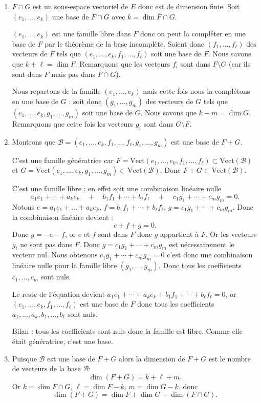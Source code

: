 \documentclass[11pt,a4paper]{article}
\begin{document}
\begin{enumerate}
  \item
$F\cap G$ est un sous-espace vectoriel de $E$ donc est de dimension finie.
Soit $(e_1,\ldots, e_k)$ une base de $F\cap G$ avec $k=\dim F\cap G$.

$(e_1,\ldots, e_k)$ est une famille libre dans $F$ donc on peut la compl\'eter en une base de $F$ 
par le th\'eor\`eme de la base incompl\`ete.
Soient donc $(f_1,\ldots,f_\ell)$ des vecteurs de $F$ tels que 
$(e_1,\ldots, e_k,f_1,\ldots,f_\ell)$ soit une base de $F$.
Nous savons que $k+\ell = \dim F$.
Remarquons que les vecteurs $f_i$ sont dans $F\setminus G$ (car ils sont dans $F$ mais pas dans $F\cap G$).

Nous repartons de la famille $(e_1,\ldots, e_k)$ mais cette fois nous la compl\'etons en une base de $G$ : soit donc $(g_1,\ldots,g_m)$ des vecteurs de $G$ tels que $(e_1,\ldots, e_k,g_1,\ldots,g_m)$ soit une base de $G$.
Nous savons que $k+m = \dim G$.
Remarquons que cette fois les vecteurs $g_i$ sont dans $G\setminus F$.

\item Montrons que $\mathcal{B}=(e_1,\ldots, e_k,f_1,\ldots,f_\ell,g_1,\ldots,g_m)$ est une base de $F+G$.

C'est une famille g\'en\'eratrice car $F=\mathrm{Vect}(e_1,\ldots, e_k,f_1,\ldots,f_\ell) \subset \mathrm{Vect}(\mathcal{B})$ et $G=\mathrm{Vect}(e_1,\ldots, e_k,g_1,\ldots,g_m) \subset \mathrm{Vect}(\mathcal{B})$. Donc $F+G \subset  \mathrm{Vect}(\mathcal{B})$.

C'est une famille libre : en effet soit une combinaison lin\'eaire nulle
$$a_1e_1+\cdots+ a_ke_k\quad + \quad b_1f_1+\cdots +b_\ell f_\ell \quad + \quad c_1 g_1+\cdots +c_m g_m=0.$$
Notons $e=a_1e_1+\ldots +a_ke_k$, $f=b_1f_1+\cdots +b_\ell f_\ell$, $g=c_1 g_1+\cdots +c_m g_m$.
Donc la combinaison lin\'eaire devient :
$$e+f+g=0.$$
Donc $g=-e-f$, or $e$ et $f$ sont dans $F$ donc $g$ appartient \`a $F$.
Or les vecteurs $g_i$ ne sont pas dans $F$. Donc 
$g=c_1 g_1+\cdots+ c_m g_m$ est n\'ecessairement le vecteur nul.
Nous obtenons $c_1 g_1+\cdots+ c_m g_m=0$ c'est donc une combinaison lin\'eaire nulle pour la famille libre 
$(g_1,\ldots,g_m)$. Donc tous les coefficients $c_1,\ldots,c_m$ sont nuls.

Le reste de l'\'equation devient $a_1e_1+\cdots +a_ke_k+b_1f_1+\cdots +b_\ell f_\ell=0$,
or $(e_1,\ldots, e_k,f_1,\ldots,f_\ell)$ est une base de $F$ donc tous les coefficients 
$a_1,\ldots,a_k,b_1,\ldots,b_\ell$ sont nuls.

Bilan : tous les coefficients sont nuls donc la famille est libre. Comme elle \'etait g\'en\'eratrice, c'est une base.


  \item Puisque $\mathcal{B}$ est une base de $F+G$ alors la dimension de $F+G$ est le nombre de vecteurs de la base $\mathcal{B}$:
$$\dim (F+G) = k + \ell + m.$$
Or $k=\dim F\cap G$, $\ell = \dim F - k$, $m=\dim G - k$, donc 
$$\dim (F+G) = \dim F + \dim G - \dim (F\cap G).$$

\end{enumerate}
\end{document}
